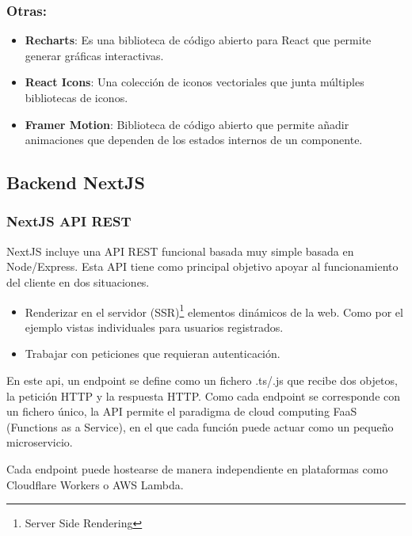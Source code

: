 \hypertarget{otras}{%
\subsubsection{Otras:}\label{otras}}

\begin{itemize}
\item
  \textbf{Recharts}: Es una biblioteca de código abierto para React que
  permite generar gráficas interactivas.
\item
  \textbf{React Icons}: Una colección de iconos vectoriales que junta
  múltiples bibliotecas de iconos.
\item
  \textbf{Framer Motion}: Biblioteca de código abierto que permite
  añadir animaciones que dependen de los estados internos de un
  componente.
\end{itemize}

\hypertarget{backend-nextjs}{%
\subsection{Backend NextJS}\label{backend-nextjs}}

\hypertarget{nextjs-api-rest}{%
\subsubsection{NextJS API REST}\label{nextjs-api-rest}}

NextJS incluye una API REST funcional basada muy simple basada en
Node/Express. Esta API tiene como principal objetivo apoyar al
funcionamiento del cliente en dos situaciones.

\begin{itemize}
\item
  Renderizar en el servidor (SSR)\footnote{Server Side Rendering} elementos dinámicos de la web. Como
  por el ejemplo vistas individuales para usuarios registrados.
\item
  Trabajar con peticiones que requieran autenticación.
\end{itemize}

En este api, un endpoint se define como un fichero .ts/.js que recibe
dos objetos, la petición HTTP y la respuesta HTTP. Como cada endpoint se
corresponde con un fichero único, la API permite el paradigma de cloud
computing FaaS (Functions as a Service), en el que cada función puede
actuar como un pequeño microservicio.

Cada endpoint puede hostearse de manera independiente en plataformas
como Cloudflare Workers o AWS Lambda.

